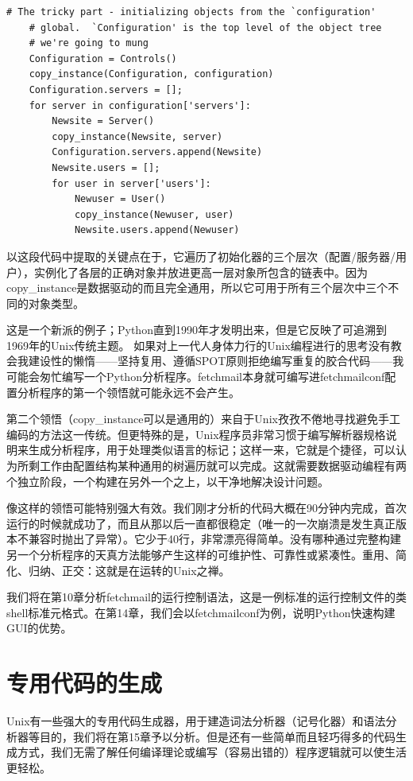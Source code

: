 \documentclass[12pt,oneside]{book}
\begin{document}
\begin{Verbatim}[label=例 9.4 copy\_{}instance的调用环境]
    # The tricky part - initializing objects from the `configuration' 
    # global.  `Configuration' is the top level of the object tree 
    # we're going to mung 
    Configuration = Controls()
    copy_instance(Configuration, configuration)
    Configuration.servers = [];
    for server in configuration['servers']:
        Newsite = Server()
        copy_instance(Newsite, server)
        Configuration.servers.append(Newsite)
        Newsite.users = [];
        for user in server['users']:
            Newuser = User()
            copy_instance(Newuser, user)
            Newsite.users.append(Newuser)
\end{Verbatim}

以这段代码中提取的关键点在于，它遍历了初始化器的三个层次（配置/服务器/用户），实例化了各层的正确对象并放进更高一层对象所包含的链表中。因为copy\_{}instance是数据驱动的而且完全通用，所以它可用于所有三个层次中三个不同的对象类型。

这是一个新派的例子；Python直到1990年才发明出来，但是它反映了可追溯到1969年的Unix传统主题。  如果对上一代人身体力行的Unix编程进行的思考没有教会我建设性的懒惰——坚持复用、遵循SPOT原则拒绝编写重复的胶合代码——我可能会匆忙编写一个Python分析程序。fetchmail本身就可编写进fetchmailconf配置分析程序的第一个领悟就可能永远不会产生。

第二个领悟（copy\_{}instance可以是通用的）来自于Unix孜孜不倦地寻找避免手工编码的方法这一传统。但更特殊的是，Unix程序员非常习惯于编写解析器规格说明来生成分析程序，用于处理类似语言的标记；这样一来，它就是个捷径，可以认为所剩工作由配置结构某种通用的树遍历就可以完成。这就需要数据驱动编程有两个独立阶段，一个构建在另外一个之上，以干净地解决设计问题。

像这样的领悟可能特别强大有效。我们刚才分析的代码大概在90分钟内完成，首次运行的时候就成功了，而且从那以后一直都很稳定（唯一的一次崩溃是发生真正版本不兼容时抛出了异常）。它少于40行，非常漂亮得简单。没有哪种通过完整构建另一个分析程序的天真方法能够产生这样的可维护性、可靠性或紧凑性。重用、简化、归纳、正交：这就是在运转的Unix之禅。

我们将在第10章分析fetchmail的运行控制语法，这是一例标准的运行控制文件的类shell标准元格式。在第14章，我们会以fetchmailconf为例，说明Python快速构建GUI的优势。


\section{专用代码的生成}
Unix有一些强大的专用代码生成器，用于建造词法分析器（记号化器）和语法分析器等目的，我们将在第15章予以分析。但是还有一些简单而且轻巧得多的代码生成方式，我们无需了解任何编译理论或编写（容易出错的）程序逻辑就可以使生活更轻松。
\end{document}
